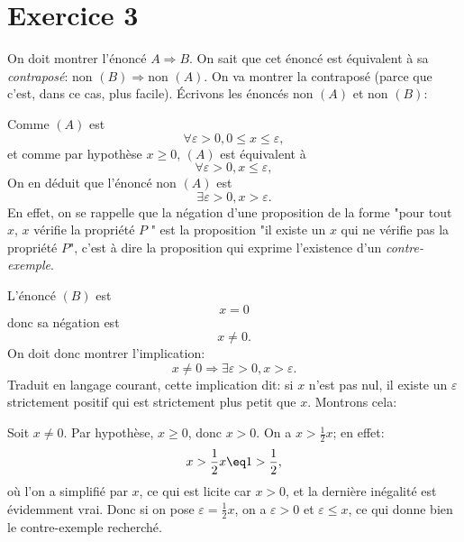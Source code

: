 \documentclass[12pt, a4paper,oneside]{article} %
\begin{document}
\section{Exercice 3}

On doit montrer l'énoncé $ A \Rightarrow B $.
On sait que cet énoncé est équivalent à sa \emph{contraposé}:
$ \text{non } (B) \Rightarrow \text{non } (A) $.
On va montrer la contraposé (parce que c'est, dans ce cas, plus facile).
Écrivons les énoncés
$ \text{non } (A) $ 
et 
$ \text{non } (B) $:

Comme $ (A) $ est
\begin{equation}
	\forall \varepsilon > 0, 0 \le x \le \varepsilon
	,
\end{equation}
et comme par hypothèse
$ x \ge 0 $,
$ (A) $ est équivalent à
\begin{equation}
	\forall \varepsilon > 0, x \le \varepsilon
	,
\end{equation}
On en déduit que l'énoncé 
$ \text{non } (A) $ 
est
\begin{equation}
	\exists \varepsilon > 0, x > \varepsilon
	.
\end{equation}
En effet, on se rappelle que la négation
d'une proposition de la forme
"pour tout $ x $, $ x $ vérifie la propriété $ P $ "
est la proposition
"il existe un $ x $ qui ne vérifie pas la propriété $ P $",
c'est à dire la proposition qui exprime
l'existence d'un \emph{contre-exemple}.

L'énoncé $ (B) $ est
\begin{equation}
	x = 0
\end{equation}
donc sa négation est
\begin{equation}
	x \neq 0
	.
\end{equation}
On doit donc montrer l'implication:
\begin{equation}
	x \neq 0
	\Rightarrow
	\exists \varepsilon > 0, x > \varepsilon
	.
\end{equation}
Traduit en langage courant, cette implication dit:
si $ x $ n'est pas nul, il existe un $ \varepsilon $
strictement positif qui est strictement plus petit que
$ x $. Montrons cela:

Soit $ x \neq 0 $. Par hypothèse,
$ x \ge 0 $, donc $ x > 0 $.
On a $ x > \frac{1}{2} x $;
en effet:
\begin{align}
	x > \frac{1}{2} x
	\eq
	1 > \frac{1}{2}
	,
\end{align}
où l'on a simplifié par $ x $,
ce qui est licite car $ x > 0 $,
et la dernière inégalité est évidemment vrai.
Donc si on pose $ \varepsilon = \frac{1}{2} x $,
on a $ \varepsilon > 0 $ et $ \varepsilon \le x $,
ce qui donne bien le contre-exemple recherché.
\end{document}

